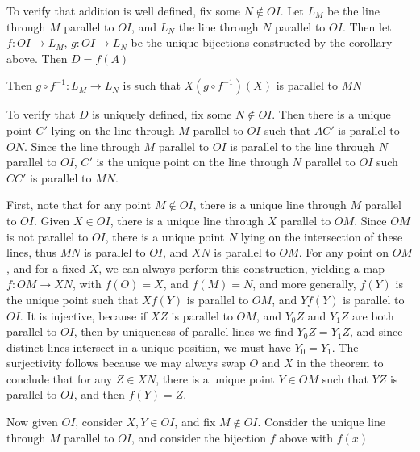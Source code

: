 To verify that addition is well defined, fix some $N \not \in OI$. Let $L_M$ be the line through $M$ parallel to $OI$, and $L_N$ the line through $N$ parallel to $OI$. Then let $f: OI \to L_M$, $g: OI \to L_N$ be the unique bijections constructed by the corollary above. Then $D = f(A)$


Then $g \circ f^{-1}: L_M \to L_N$ is such that $X(g \circ f^{-1})(X)$ is parallel to $MN$

To verify that $D$ is uniquely defined, fix some $N \not \in OI$. Then there is a unique point $C'$ lying on the line through $M$ parallel to $OI$ such that $AC'$ is parallel to $ON$. Since the line through $M$ parallel to $OI$ is parallel to the line through $N$ parallel to $OI$, $C'$ is the unique point on the line through $N$ parallel to $OI$ such $CC'$ is parallel to $MN$.

First, note that for any point $M \not \in OI$, there is a unique line through $M$ parallel to $OI$. Given $X \in OI$, there is a unique line through $X$ parallel to $OM$. Since $OM$ is not parallel to $OI$, there is a unique point $N$ lying on the intersection of these lines, thus $MN$ is parallel to $OI$, and $XN$ is parallel to $OM$. For any point on $OM$, and for a fixed $X$, we can always perform this construction, yielding a map $f: OM \to XN$, with $f(O) = X$, and $f(M) = N$, and more generally, $f(Y)$ is the unique point such that $Xf(Y)$ is parallel to $OM$, and $Yf(Y)$ is parallel to $OI$. It is injective, because if $XZ$ is parallel to $OM$, and $Y_0Z$ and $Y_1Z$ are both parallel to $OI$, then by uniqueness of parallel lines we find $Y_0Z = Y_1Z$, and since distinct lines intersect in a unique position, we must have $Y_0 = Y_1$. The surjectivity follows because we may always swap $O$ and $X$ in the theorem to conclude that for any $Z \in XN$, there is a unique point $Y \in OM$ such that $YZ$ is parallel to $OI$, and then $f(Y) = Z$.

Now given $OI$, consider $X,Y \in OI$, and fix $M \not \in OI$. Consider the unique line through $M$ parallel to $OI$, and consider the bijection $f$ above with $f(x)$

